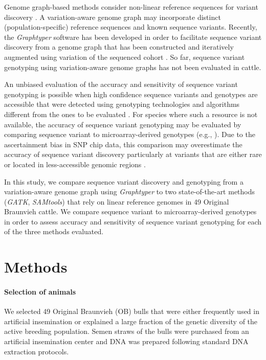 \documentclass[../main.tex]{subfiles}
\begin{document}
Genome graph-based methods consider non-linear reference sequences for variant discovery \citep{rakocevic2019fast,eggertsson2017graphtyper,novak2017genome,garrison2018variation,sibbesen2018accurate}. A variation-aware genome graph may incorporate distinct (population-specific) reference sequences and known sequence variants. Recently, the \emph{Graphtyper} software has been developed in order to facilitate sequence variant discovery from a genome graph that has been constructed and iteratively augmented using variation of the sequenced cohort \citep{eggertsson2017graphtyper}. So far, sequence variant genotyping using variation-aware genome graphs has not been evaluated in cattle.

An unbiased evaluation of the accuracy and sensitivity of sequence variant genotyping is possible when high confidence sequence variants and genotypes are accessible that were detected using genotyping technologies and algorithms different from the ones to be evaluated \citep{li2018synthetic}. For species where such a resource is not available, the accuracy of sequence variant genotyping may be evaluated by comparing sequence variant to microarray-derived genotypes (e.g., \citep{Jansen2013,depristo2011framework}). Due to the ascertainment bias in SNP chip data, this comparison may overestimate the accuracy of sequence variant discovery particularly at variants that are either rare or located in less-accessible genomic regions \citep{li2014toward,malomane2018efficiency}.

In this study, we compare sequence variant discovery and genotyping from a variation-aware genome graph using \emph{Graphtyper} to two state-of-the-art methods (\emph{GATK}, \emph{SAMtools}) that rely on linear reference genomes in 49 Original Braunvieh cattle. We compare sequence variant to microarray-derived genotypes in order to assess accuracy and sensitivity of sequence variant genotyping for each of the three methods evaluated.

\section{Methods}
\label{chap2:met}

\paragraph{Selection of animals} 

We selected 49 Original Braunvieh (OB) bulls that were either frequently used in artificial insemination or explained a large fraction of the genetic diversity of the active breeding population. Semen straws of the bulls were purchased from an artificial insemination center and DNA was prepared following standard DNA extraction protocols.
\end{document}
